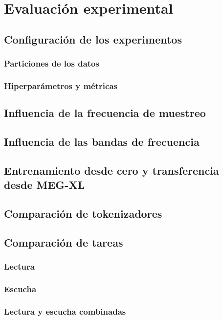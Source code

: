 \chapter{Evaluación experimental}

\section{Configuración de los experimentos}
\subsection{Particiones de los datos}
\subsection{Hiperparámetros y métricas}

\section{Influencia de la frecuencia de muestreo}

\section{Influencia de las bandas de frecuencia}

\section{Entrenamiento desde cero y transferencia desde MEG-XL}


\section{Comparación de tokenizadores}

\section{Comparación de tareas}
\subsection{Lectura}
\subsection{Escucha}
\subsection{Lectura y escucha combinadas}

